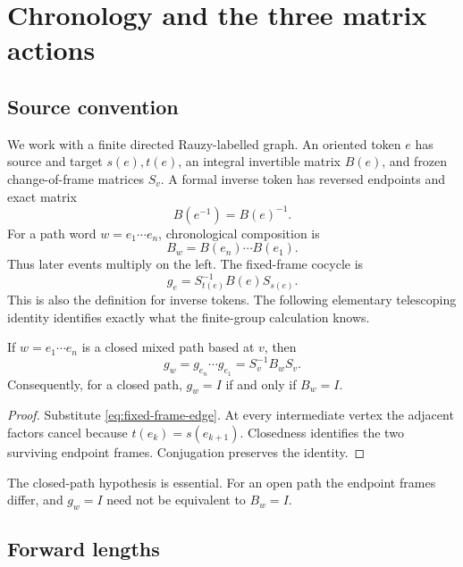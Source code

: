 \section{Chronology and the three matrix actions}
\label{sec:setting}

\subsection{Source convention}

We work with a finite directed Rauzy-labelled graph.  An oriented token $e$
has source and target $s(e),t(e)$, an integral invertible matrix $B(e)$, and
frozen change-of-frame matrices $S_v$.  A formal inverse token has reversed
endpoints and exact matrix
\[
B(e^{-1})=B(e)^{-1}.
\]
For a path word $w=e_1\cdots e_n$, chronological composition is
\begin{equation}
  B_w=B(e_n)\cdots B(e_1).
  \label{eq:chronology}
\end{equation}
Thus later events multiply on the left.  The fixed-frame cocycle is
\begin{equation}
  g_e=S_{t(e)}^{-1}B(e)S_{s(e)}.
  \label{eq:fixed-frame-edge}
\end{equation}
This is also the definition for inverse tokens.  The following elementary
telescoping identity identifies exactly what the finite-group calculation
knows.

\begin{proposition}
\label{prop:frame-telescope}
If $w=e_1\cdots e_n$ is a closed mixed path based at $v$, then
\[
  g_w=g_{e_n}\cdots g_{e_1}=S_v^{-1}B_wS_v.
\]
Consequently, for a closed path, $g_w=I$ if and only if $B_w=I$.
\end{proposition}

\begin{proof}
Substitute \eqref{eq:fixed-frame-edge}.  At every intermediate vertex the
adjacent factors cancel because $t(e_k)=s(e_{k+1})$.  Closedness identifies
the two surviving endpoint frames.  Conjugation preserves the identity.
\end{proof}

The closed-path hypothesis is essential.  For an open path the endpoint
frames differ, and $g_w=I$ need not be equivalent to $B_w=I$.

\subsection{Forward lengths}

